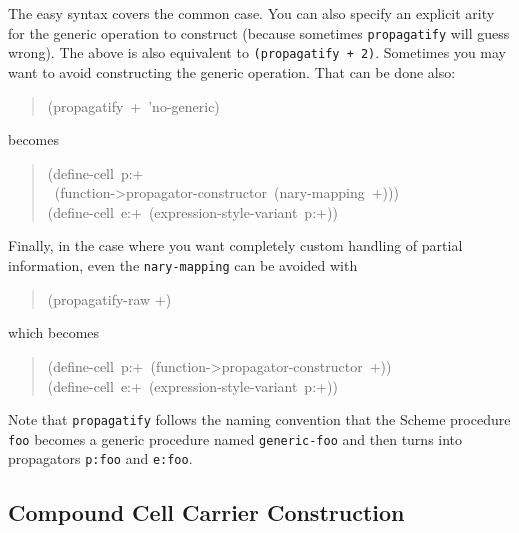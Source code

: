 \documentclass[12pt,letterpaper,english]{article}
\begin{document}
The easy syntax covers the common case.  You can also specify an
explicit arity for the generic operation to construct (because
sometimes \texttt{propagatify} will guess wrong).  The above is also
equivalent to \texttt{(propagatify + 2)}.  Sometimes you may want to avoid
constructing the generic operation.  That can be done also:
\begin{quote}{\ttfamily \raggedright \noindent
(propagatify~+~'no-generic)
}\end{quote}
becomes
\begin{quote}{\ttfamily \raggedright \noindent
(define-cell~p:+~\\
~(function->propagator-constructor~(nary-mapping~+)))~\\
(define-cell~e:+~(expression-style-variant~p:+))
}\end{quote}

Finally, in the case where you want completely custom handling of
partial information, even the \texttt{nary-mapping} can be avoided with
\begin{quote}

(propagatify-raw +)
\end{quote}
which becomes
\begin{quote}{\ttfamily \raggedright \noindent
(define-cell~p:+~(function->propagator-constructor~+))~\\
(define-cell~e:+~(expression-style-variant~p:+))
}\end{quote}

Note that \texttt{propagatify} follows the naming convention that the
Scheme procedure \texttt{foo} becomes a generic procedure named
\texttt{generic-foo} and then turns into propagators \texttt{p:foo} and
\texttt{e:foo}.



\hypertarget{compound-cell-carrier-construction}{}
\subsection{Compound Cell Carrier Construction}
\label{compound-cell-carrier-construction}
\end{document}
